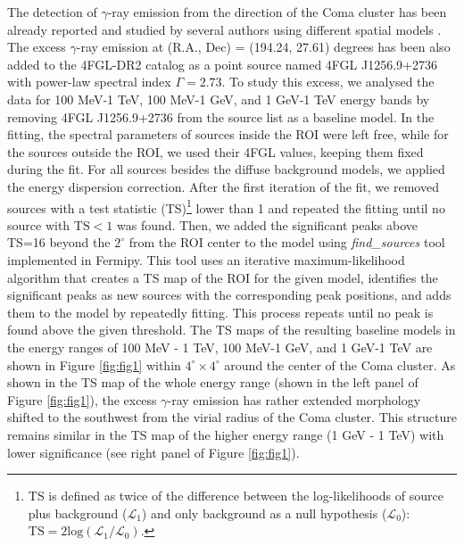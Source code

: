 \documentclass[fleqn,usenatbib]{mnras}
\begin{document}
The detection of $\gamma$-ray emission from the direction of the Coma cluster has been already reported and studied by several authors using different spatial models \citep{fermicoma2018PhRvD..98f3006X,2021A&A...648A..60A,zargaryan_coma}. The excess $\gamma$-ray emission at (R.A., Dec) = (194.24,  27.61) degrees has been also added to the 4FGL-DR2 catalog as a point source named 4FGL J1256.9+2736 with power-law spectral index $\Gamma=2.73$. To study this excess, we analysed the data for 100 MeV-1 TeV, 100 MeV-1 GeV, and 1 GeV-1 TeV energy bands by removing 4FGL J1256.9+2736 from the source list as a baseline model. In the fitting, the spectral parameters of sources inside the ROI were left free, while for the sources outside the ROI, we used their 4FGL values, keeping them fixed during the fit. For all sources besides the diffuse background models, we applied the energy dispersion correction. After the first iteration of the fit, we removed sources with a test statistic (TS)\footnote{TS is defined as twice of the difference between the log-likelihoods of source plus background ($\mathrm{\mathcal{L}_1}$) and only background as a null hypothesis ($\mathrm{\mathcal{L}_0}$): $\mathrm{TS = 2log(\mathcal{L}_1/\mathcal{L}_0)}$.} lower than 1 and repeated the fitting until no source with $\mathrm{TS<1}$ was found. Then, we added the significant peaks above TS=16 beyond the  $\mathrm{2^{\circ}}$ from the ROI center to the model using \textit{find{\_}sources} tool implemented in Fermipy. This tool uses an iterative maximum-likelihood algorithm that creates a TS map of the ROI for the given model, identifies the significant peaks as new sources with the corresponding peak positions, and adds them to the model by repeatedly fitting. This process repeats until no peak is found above the given threshold. The TS maps of the resulting baseline models in the energy ranges of 100 MeV - 1 TeV, 100 MeV-1 GeV, and 1 GeV-1 TeV are shown in Figure \ref{fig:fig1} within $\mathrm{4^{\circ} \times 4^{\circ}}$ around the center of the Coma cluster. As shown in the TS map of the whole energy range (shown in the left panel of Figure \ref{fig:fig1}), the excess $\gamma$-ray emission has rather extended morphology shifted to the southwest from the virial radius of the Coma cluster. This structure remains similar in the TS map of the higher energy range (1 GeV - 1 TeV) with lower significance (see right panel of Figure \ref{fig:fig1}).
\end{document}
